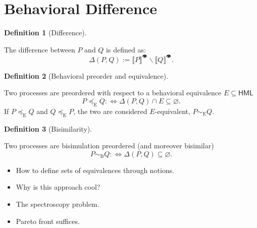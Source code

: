 \documentclass[
  a4paper,
]{report}
\providecommand{\tightlist}{%
  \setlength{\itemsep}{0pt}\setlength{\parskip}{0pt}}\usepackage{longtable,booktabs,array}
\theoremstyle{plain}
\theoremstyle{plain}
\theoremstyle{definition}
\newtheorem{definition}{Definition}[section]
\theoremstyle{plain}
\theoremstyle{definition}
\theoremstyle{remark}
\begin{document}
\section{Behavioral Difference}\label{behavioral-difference}

\begin{definition}[Difference]\protect\hypertarget{def-difference}{}\label{def-difference}

The difference between \(P\) and \(Q\) is defined as:
\[\Delta(P,Q) := \llbracket P \rrbracket^👁 \mathbin{\backslash}\llbracket Q \rrbracket^👁.\]

\end{definition}

\begin{definition}[Behavioral preorder and
equivalence]\protect\hypertarget{def-behavioraleq}{}\label{def-behavioraleq}

Two processes are preordered with respect to a behavioral equivalence
\(E \subseteq \textsf{HML}\)
\[P \preceq_\mathrm{E} Q \mathrel{:\!\iff}\Delta(P,Q) \cap E \subseteq \varnothing.\]
If \(P \preceq_\mathrm{E} Q\) and \(Q \preceq_\mathrm{E} P\), the two
are considered \(E\)-equivalent, \(P \sim_\mathrm{E} Q\).

\end{definition}

\begin{definition}[Bisimilarity]\protect\hypertarget{def-bisimilarity-again}{}\label{def-bisimilarity-again}

Two processes are bisimulation preordered (and moreover bisimilar)
\[P \sim_\mathrm{B} Q \mathrel{:\!\iff}\Delta(P,Q) \subseteq \varnothing.\]

\end{definition}

\begin{itemize}
\tightlist
\item
  How to define sets of equivalences through notions.
\item
  Why is this approach cool?
\item
  The spectroscopy problem.
\item
  Pareto front suffices.
\end{itemize}
\end{document}
